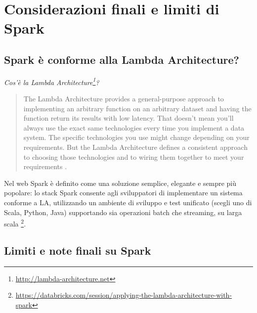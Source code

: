\documentclass[12pt,italian]{article}
\begin{document}
\section{Considerazioni finali e limiti di Spark}
\subsection{Spark è conforme alla Lambda Architecture?}
\textit{Cos'è la Lambda Architecture\footnote{\url{http://lambda-architecture.net}}?} 

\begin{quote}
The Lambda Architecture provides a general-purpose approach to implementing an arbitrary function on an arbitrary dataset and having the function return its results with low latency. That doesn’t mean you’ll always use the exact same technologies every time you implement a data system. The specific technologies you use might change depending on your requirements. But the Lambda Architecture defines a consistent approach to choosing those technologies and to wiring them together to meet your requirements \cite{lambdaArchitecture}.
\end{quote}
Nel web Spark è definito come una soluzione semplice, elegante e sempre più popolare: lo stack Spark consente agli sviluppatori di implementare un sistema conforme a LA, utilizzando un ambiente di sviluppo e test unificato (scegli uno di Scala, Python, Java) supportando sia operazioni batch che streaming, su larga scala \footnote{\url{https://databricks.com/session/applying-the-lambda-architecture-with-spark}}.

\subsection{Limiti e note finali su Spark}
\end{document}
